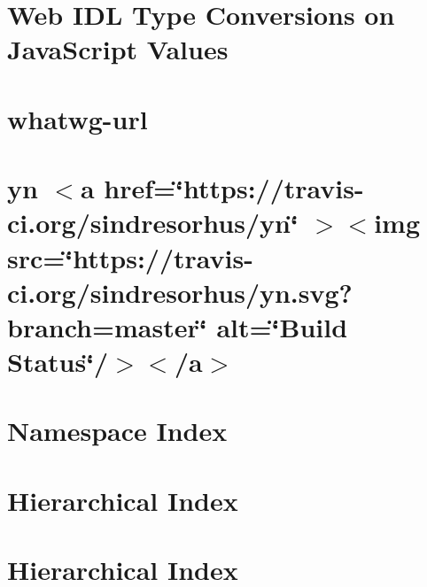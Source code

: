 \documentclass[twoside]{book}
\newcommand{\+}{\discretionary{\mbox{\scriptsize$\hookleftarrow$}}{}{}}
\begin{document}
\chapter{Web IDL Type Conversions on Java\+Script Values}
\label{md__c___users_vaishnavi_jadhav__desktop__developer_code_mean_stack_example_server_node_modules_webidl_conversions__r_e_a_d_m_e}

\chapter{whatwg-\/url}
\label{md__c___users_vaishnavi_jadhav__desktop__developer_code_mean_stack_example_server_node_modules_whatwg_url__r_e_a_d_m_e}

\chapter{yn \texorpdfstring{$<$}{<}a href=\char`\"{}https\+://travis-\/ci.\+org/sindresorhus/yn\char`\"{} \texorpdfstring{$>$}{>}\texorpdfstring{$<$}{<}img src=\char`\"{}https\+://travis-\/ci.\+org/sindresorhus/yn.\+svg?branch=master\char`\"{} alt=\char`\"{}\+Build Status\char`\"{}/\texorpdfstring{$>$}{>}\texorpdfstring{$<$}{<}/a\texorpdfstring{$>$}{>}}
\label{md__c___users_vaishnavi_jadhav__desktop__developer_code_mean_stack_example_server_node_modules_yn_readme}

\chapter{Namespace Index}

\chapter{Hierarchical Index}

\chapter{Hierarchical Index}

\end{document}
